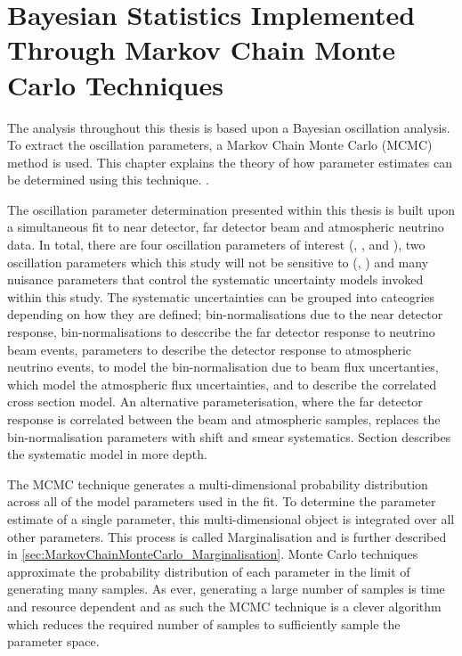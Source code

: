 \chapter{Bayesian Statistics Implemented Through Markov Chain Monte Carlo Techniques}
\label{chap:MarkovChainMonteCarlo}
The analysis throughout this thesis is based upon a Bayesian oscillation analysis. To extract the oscillation parameters, a Markov Chain Monte Carlo (MCMC) method is used. This chapter explains the theory of how parameter estimates can be determined using this technique. .

The oscillation parameter determination presented within this thesis is built upon a simultaneous fit to near detector, far detector beam and atmospheric neutrino data. In total, there are four oscillation parameters of interest (\sinsqatm, \sinsqreac, \delmsqatm and \dcp), two oscillation parameters which this study will not be sensitive to (\sinsqsol, \delmsqsol) and  many nuisance parameters that control the systematic uncertainty models invoked within this study. The systematic uncertainties can be grouped into cateogries depending on how they are defined;  bin-normalisations due to the near detector response,  bin-normalisations to desccribe the far detector response to neutrino beam events,  parameters to describe the detector response to atmospheric neutrino events,  to model the bin-normalisation due to beam flux uncertanties,  which model the atmospheric flux uncertainties, and  to describe the correlated cross section model. An alternative parameterisation, where the far detector response is correlated between the beam and atmospheric samples, replaces the bin-normalisation parameters with  shift and smear systematics. Section  describes the systematic model in more depth.

The MCMC technique generates a multi-dimensional probability distribution across all of the model parameters used in the fit. To determine the parameter estimate of a single parameter, this multi-dimensional object is integrated over all other parameters. This process is called Marginalisation and is further described in \autoref{sec:MarkovChainMonteCarlo_Marginalisation}. Monte Carlo techniques approximate the probability distribution of each parameter in the limit of generating many samples. As ever, generating a large number of samples is time and resource dependent and as such the MCMC technique is a clever algorithm which reduces the required number of samples to sufficiently sample the parameter space.

